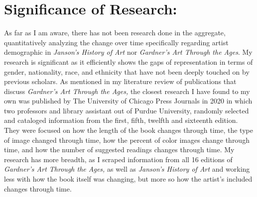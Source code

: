 \documentclass[
  letterpaper,
  DIV=11,
  numbers=noendperiod]{scrreprt}
\begin{document}
\hypertarget{significance-of-research}{%
\section{Significance of Research:}\label{significance-of-research}}

As far as I am aware, there has not been research done in the aggregate,
quantitatively analyzing the change over time specifically regarding
artist demographic in \emph{Janson's History of Art} nor \emph{Gardner's
Art Through the Ages}. My research is significant as it efficiently
shows the gaps of representation in terms of gender, nationality, race,
and ethnicity that have not been deeply touched on by previous scholars.
As mentioned in my literature review of publications that discuss
\emph{Gardner's Art Through the Ages,} the closest research I have found
to my own was published by The University of Chicago Press Journals in
2020 in which two professors and library assistant out of Purdue
University, randomly selected and cataloged information from the first,
fifth, twelfth and sixteenth edition. They were focused on how the
length of the book changes through time, the type of image changed
through time, how the percent of color images change through time, and
how the number of suggested readings changes through time. My research
has more breadth, as I scraped information from all 16 editions of
\emph{Gardner's Art Through the Ages,} as well as \emph{Janson's History
of Art} and working less with how the book itself was changing, but more
so how the artist's included changes through time.
\end{document}
